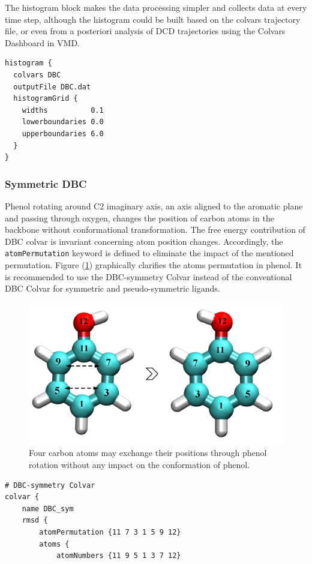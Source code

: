 \documentclass[9pt,tutorial]{livecoms}
\begin{document}
The histogram block makes the data processing simpler and collects data at every time step, although the histogram could be built based on the colvars trajectory file, or even from a posteriori analysis of DCD trajectories using the Colvars Dashboard in VMD.

\begin{verbatim}
histogram {
  colvars DBC
  outputFile DBC.dat
  histogramGrid {
    widths          0.1 
    lowerboundaries 0.0
    upperboundaries 6.0
  }
}
\end{verbatim}

\subsubsection{Symmetric DBC}
Phenol rotating around C2 imaginary axis, an axis aligned to the aromatic plane and passing through oxygen, changes the position of carbon atoms in the backbone without conformational transformation.  The free energy contribution of DBC colvar is invariant concerning atom position changes. Accordingly, the \texttt{atomPermutation} keyword is defined to eliminate the impact of the mentioned permutation. Figure (\ref{fig:scheme4}) graphically clarifies the atoms permutation in phenol. It is recommended to use the DBC-symmetry Colvar instead of the conventional DBC Colvar for symmetric and pseudo-symmetric ligands.
\begin{figure}[!ht]
\centering
\includegraphics[width=\linewidth]{phenol-permutation-new}
\caption{Four carbon atoms may exchange their positions through phenol rotation without any impact on the conformation of phenol.}
\label{fig:scheme4}
\end{figure}
\begin{verbatim}
# DBC-symmetry Colvar
colvar {
    name DBC_sym
    rmsd {
        atomPermutation {11 7 3 1 5 9 12}
        atoms {
            atomNumbers {11 9 5 1 3 7 12}
\end{verbatim}
\end{document}
